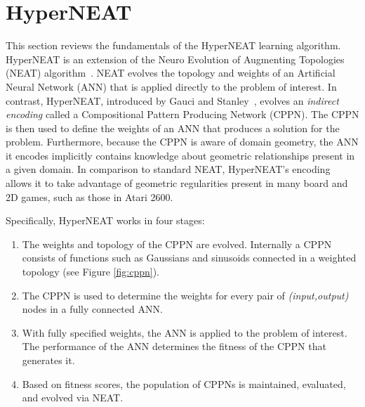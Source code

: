 \documentclass{sig-alternate}
\begin{document}
\section{HyperNEAT}
\label{sec:hyperneat}
This section reviews the fundamentals of the HyperNEAT learning algorithm. HyperNEAT is an extension of the Neuro Evolution of Augmenting Topologies (NEAT) algorithm~\cite{stanley02}. NEAT evolves the topology and weights of an Artificial Neural Network (ANN) that is applied directly to the problem of interest. In contrast, HyperNEAT, introduced by Gauci and Stanley~\cite{gauci08}, evolves an \emph{indirect encoding} called a Compositional Pattern Producing Network (CPPN). The CPPN is then used to define the weights of an ANN that produces a solution for the problem. Furthermore, because the CPPN is aware of domain geometry, the ANN it encodes implicitly contains knowledge about geometric relationships present in a given domain. In comparison to standard NEAT, HyperNEAT's encoding allows it to take advantage of geometric regularities present in many board and 2D games, such as those in Atari 2600. 

Specifically, HyperNEAT works in four stages:

\begin{enumerate}
\item The weights and topology of the CPPN are evolved. Internally a CPPN consists of functions such as Gaussians and sinusoids connected in a weighted topology (see Figure \ref{fig:cppn}).
\item The CPPN is used to determine the weights for every pair of \emph{(input,output)} nodes in a fully connected ANN.
\item With fully specified weights, the ANN is applied to the problem of interest. The performance of the ANN determines the fitness of the CPPN that generates it.
\item Based on fitness scores, the population of CPPNs is maintained, evaluated, and evolved via NEAT.
\end{enumerate}
\end{document}
